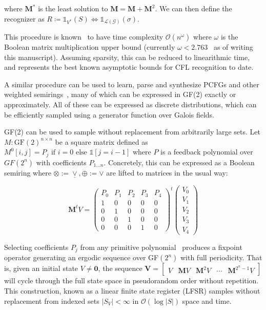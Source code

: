 \documentclass[sigplan,10pt,review,anonymous]{acmart}
\begin{document}
\noindent where $\mathbf{M}^*$ is the least solution to $\mathbf{M} = \mathbf{M} + \mathbf{M}^2$. We can then define the recognizer as $R \coloneqq \mathds{1}_{V^*}(S) \iff \mathds{1}_{\mathcal{L}(\mathcal{G})}(\sigma)$.

This procedure is known~\citep{lee2002fast} to have time complexity $\mathcal{O}(n^\omega)$ where $\omega$ is the Boolean matrix multiplication upper bound (currently $\omega < 2.763$~\citep{harris2021improved} as of writing this manuscript). Assuming sparsity, this can be reduced to linearithmic time, and represents the best known asymptotic bounds for CFL recognition to date.

A similar procedure can be used to learn, parse and synthesize PCFGs and other weighted semirings~\citep{goodman1999semiring}, many of which can be expressed in GF(2) exactly or approximately. All of these can be expressed as discrete distributions, which can be efficiently sampled using a generator function over Galois fields.

GF(2) can be used to sample without replacement from arbitrarily large sets. Let $M: \text{GF}(2)^{n\times n}$ be a square matrix defined as $M^0[i, j] = P_j \text{ if } i=0 \text{ else } \mathds{1}[j = i - 1]$ where $P$ is a feedback polynomial over $GF(2^n)$ with coefficients $P_{1\ldots n}$. Concretely, this can be expressed as a Boolean semiring where $\otimes := \underline{\vee}, \oplus := \vee$ are lifted to matrices in the usual way:

\[
\mathbf{M}^tV = \begin{pmatrix}
  P_0 & P_1 & P_2 & P_3 & P_4 \\
  1 & 0 & 0 & 0 & 0 \\
  0 & 1 & 0 & 0 & 0 \\
  0 & 0 & 1 & 0 & 0 \\
  0 & 0 & 0 & 1 & 0
\end{pmatrix}^t
\begin{pmatrix}
      V_0 \\
      V_1 \\
      V_2 \\
      V_3 \\
      V_4
\end{pmatrix}
\]

Selecting coefficients $P_j$ from any primitive polynomial~\citep{saxena2004primitive} produces a fixpoint operator generating an ergodic sequence over GF$(2^n)$ with full periodicity. That is, given an initial state $V \neq \mathbf{0}$, the sequence $\mathbf{V} = \begin{bmatrix}V & \mathbf{M}V & \mathbf{M}^{2}V & \cdots & \mathbf{M}^{2^n-1}V \end{bmatrix}$ will cycle through the full state space in pseudorandom order without repetition. This construction, known as a linear finite state register (LFSR) samples without replacement from indexed sets $|S_V|<\infty$ in $\mathcal{O}(\log |S|)$ space and time.
\end{document}
